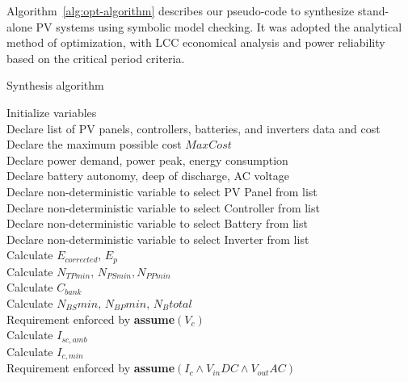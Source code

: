 Algorithm~\ref{alg:opt-algorithm} describes our pseudo-code to synthesize stand-alone PV systems using symbolic model checking. It was adopted the analytical method of optimization, with LCC economical analysis and power reliability based on the critical period criteria.
%
 \begin{algorithm}
 \caption{Synthesis algorithm}
 \begin{algorithmic}[1]
 \renewcommand{\algorithmicrequire}{\textbf{Input:}}
 \renewcommand{\algorithmicensure}{\textbf{Output:}}
  \STATE Initialize variables \\
  \STATE Declare list of PV panels, controllers, batteries, and inverters data and cost \\
  \STATE Declare the maximum possible cost $MaxCost$  \\
  \STATE Declare power demand, power peak, energy consumption \\
  \STATE Declare battery autonomy, deep of discharge, AC voltage \\
 	\STATE Declare non-deterministic variable to select PV Panel from list \\
 	\STATE Declare non-deterministic variable to select Controller from list \\
 	\STATE Declare non-deterministic variable to select Battery from list \\
 	\STATE Declare non-deterministic variable to select Inverter from list \\ 	
 	\STATE Calculate $E_{corrected}, \, E_{p} $ \\
	\STATE Calculate $N_{TPmin}, \, N_{PSmin}, N_{PPmin} $ \\
 	\STATE Calculate $C_{bank}$ \\
	\STATE Calculate $N_{BS}min, \, N_{BP}min, \, N_{B}total$ \\
	\STATE Requirement enforced by \textbf{assume}$(V_{c})$ \\
 	\STATE Calculate $I_{sc,amb}$ \\
 	\STATE Calculate $I_{c,min}$ \\
 	\STATE Requirement enforced by \textbf{assume}$(I_{c} \wedge V_{in}DC \wedge V_{out}AC)$ \\

\end{algorithmic}
\end{algorithm}
